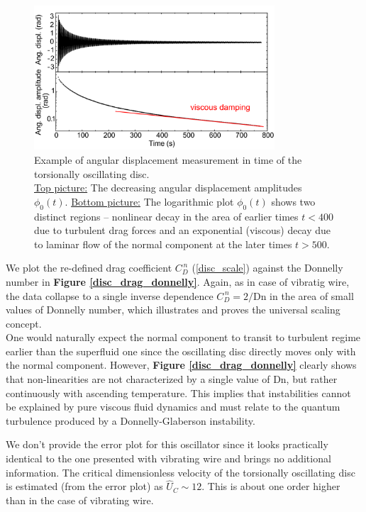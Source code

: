 \begin{figure}[h]
	\centering
  \includegraphics[width=0.8\textwidth]{graphics/results/disc_extrema}
  \caption{Example of angular displacement measurement in time of the torsionally oscillating disc.\\
  \underline{Top picture:} The decreasing angular displacement amplitudes $\phi_0 (t)$.
  \underline{Bottom picture:} The logarithmic plot $\phi_0 (t)$ shows two distinct regions – nonlinear decay in the area of earlier times $t < 400$ due to turbulent drag forces and an exponential (viscous) decay due to laminar flow of the normal component at the later times $t > 500$.}
  \label{disc_extrema}
\end{figure}

We plot the re-defined drag coefficient $C_D^{\,n}$ (\ref{disc_scale}) against the Donnelly number in \textbf{Figure \ref{disc_drag_donnelly}}.
Again, as in case of vibratig wire, the data collapse to a single inverse dependence $C_D^{\,n} = 2 / \text{Dn}$ in the area of small values of Donnelly number, which illustrates and proves the universal scaling concept.\\
One would naturally expect the normal component to transit to turbulent regime earlier than the superfluid one since the oscillating disc directly moves only with the normal component. However, \textbf{Figure \ref{disc_drag_donnelly}} clearly shows that non-linearities are not characterized by a single value of Dn, but rather continuously with ascending temperature. This implies that instabilities cannot be explained by pure viscous fluid dynamics and must relate to the quantum turbulence produced by a Donnelly-Glaberson instability.

We don't provide the error plot for this oscillator since it looks practically identical to the one presented with vibrating wire and brings no additional information. The critical dimensionless velocity of the torsionally oscillating disc is estimated (from the error plot) as $\hat{U}_C \sim 12$. This is about one order higher than in the case of vibrating wire.

